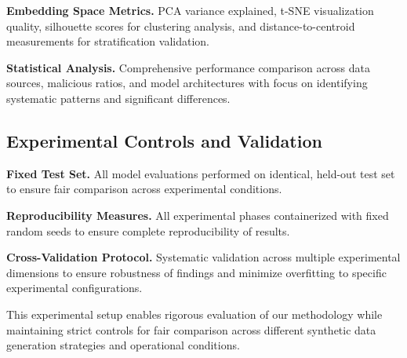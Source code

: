 \textbf{Embedding Space Metrics.} PCA variance explained, t-SNE visualization quality, silhouette scores for clustering analysis, and distance-to-centroid measurements for stratification validation.

\textbf{Statistical Analysis.} Comprehensive performance comparison across data sources, malicious ratios, and model architectures with focus on identifying systematic patterns and significant differences.

\subsection{Experimental Controls and Validation}

\textbf{Fixed Test Set.} All model evaluations performed on identical, held-out test set to ensure fair comparison across experimental conditions.

\textbf{Reproducibility Measures.} All experimental phases containerized with fixed random seeds to ensure complete reproducibility of results.

\textbf{Cross-Validation Protocol.} Systematic validation across multiple experimental dimensions to ensure robustness of findings and minimize overfitting to specific experimental configurations.

This experimental setup enables rigorous evaluation of our methodology while maintaining strict controls for fair comparison across different synthetic data generation strategies and operational conditions.